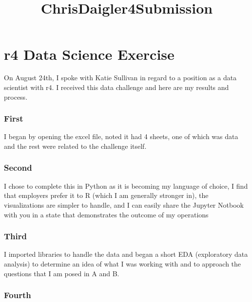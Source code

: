 \documentclass[11pt]{article}
\title{ChrisDaigler4Submission}
\begin{document}
    
    
    \maketitle
    
    

    
    \hypertarget{r4-data-science-exercise}{%
\section{r4 Data Science Exercise}\label{r4-data-science-exercise}}

On August 24th, I spoke with Katie Sullivan in regard to a position as a
data scientist with r4. I received this data challenge and here are my
results and process.

\hypertarget{first}{%
\subsubsection{First}\label{first}}

I began by opening the excel file, noted it had 4 sheets, one of which
was data and the rest were related to the challenge itself.

\hypertarget{second}{%
\subsubsection{Second}\label{second}}

I chose to complete this in Python as it is becoming my language of
choice, I find that employers prefer it to R (which I am generally
stronger in), the visualizations are simpler to handle, and I can easily
share the Jupyter Notbook with you in a state that demonstrates the
outcome of my operations

\hypertarget{third}{%
\subsubsection{Third}\label{third}}

I imported libraries to handle the data and began a short EDA
(exploratory data analysis) to determine an idea of what I was working
with and to approach the questions that I am posed in A and B.

\hypertarget{fourth}{%
\subsubsection{Fourth}\label{fourth}}
\end{document}
